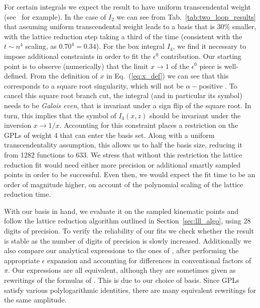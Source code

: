 \documentclass[a4paper,11pt]{article}
\begin{document}
For certain integrals we expect the result to have uniform transcendental weight (see~\cite{Arkani-Hamed:2010pyv} for example). In the case of $I_2$ we can see  from Tab.~\ref{tab:two_loop_results} that assuming uniform transcendental weight leads to a basis that is $30\%$ smaller, with the lattice reduction step taking a third of the time (consistent with the $t\sim n^4$ scaling, as $0.70^4=0.34$). For the box integral $I_4$, we find it necessary to impose additional constraints in order to fit the $\epsilon^0$ contribution. Our starting point is to observe (numerically) that the limit $x\rightarrow 1$ of the $\epsilon^0$ piece is well-defined. From the definition of $x$ in Eq.~(\ref{eq:x_def}) we can see that this corresponds to a square root singularity, which will not be $\alpha-$positive \cite{Hannesdottir:2024hke}. To cancel this square root branch cut, the integral (and in particular its symbol) needs to be \textit{Galois even}, that is invariant under a sign flip of the square root. In turn, this implies that the symbol of $I_4(x,z)$  should be invariant under the inversion $x\rightarrow 1/x$. Accounting for this constraint places a restriction on the GPLs of weight 4 that can enter the basis set. Along with a uniform transcendentality assumption, this allows us to half the basis size, reducing it from 1282 functions to 633. We stress that without this restriction the lattice reduction fit would need either more precision or additional smartly sampled points in order to be successful. Even then, we would expect the fit time to be an order of magnitude higher, on account of the polynomial scaling of the lattice reduction time.


With our basis in hand, we evaluate it on the sampled kinematic points and follow the lattice reduction algorithm outlined in Section~\ref{sec:lll_algo}, using 28 digits of precision. To verify the reliability of our fits we check whether the result is stable as the number of digits of precision is slowly increased. Additionally we also compare our analytical expressions to the ones of \cite{Gehrmann:2013cxs}, after performing the appropriate $\epsilon$ expansion and accounting for differences in conventional factors of $\pi$. Our expressions are all equivalent, although they are sometimes given as rewritings of the formulas of \cite{Gehrmann:2013cxs}. This is due to our choice of basis. Since GPLs satisfy various polylogarithmic identities, there are many equivalent rewritings for the same amplitude. 
\end{document}
